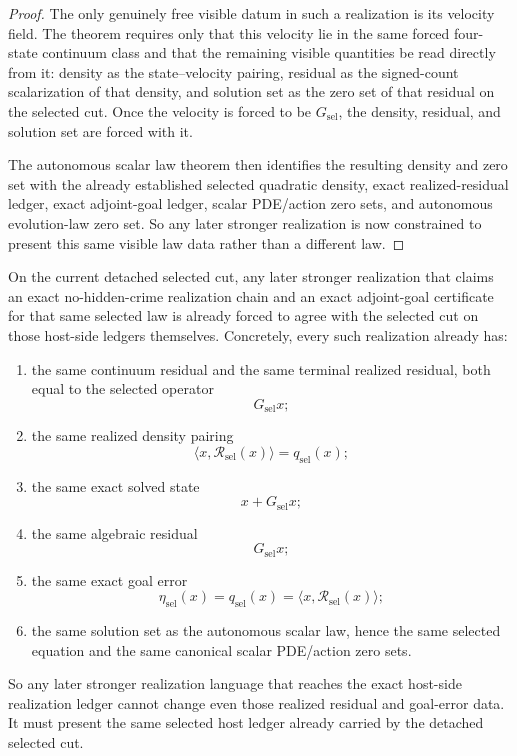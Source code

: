 \begin{proof}
The only genuinely free visible datum in such a realization is its velocity
field. The theorem requires only that this velocity lie in the same forced
four-state continuum class and that the remaining visible quantities be read
directly from it: density as the state--velocity pairing, residual as the
signed-count scalarization of that density, and solution set as the zero set
of that residual on the selected cut. Once the velocity is forced to be
\(G_{\mathrm{sel}}\), the density, residual, and solution set are forced with
it.

The autonomous scalar law theorem then identifies the resulting density and
zero set with the already established selected quadratic density, exact
realized-residual ledger, exact adjoint-goal ledger, scalar PDE/action zero
sets, and autonomous evolution-law zero set. So any later stronger
realization is now constrained to present this same visible law data rather
than a different law.
\end{proof}

\begin{theorem}
\label{thm:the-selected-cut-already-fixes-the-exact-realization-ledger-adjoint-goal-contract-for-any-later-stronger-flagship-realization}
On the current detached selected cut, any later stronger realization
that claims an exact no-hidden-crime realization chain and an exact
adjoint-goal certificate for that same selected law is already forced to agree
with the selected cut on those host-side ledgers themselves. Concretely, every
such realization already has:
\begin{enumerate}
\item the same continuum residual and the same terminal realized residual,
      both equal to the selected operator
\[
G_{\mathrm{sel}}x;
\]
\item the same realized density pairing
\[
\langle x,\mathcal R_{\mathrm{sel}}(x)\rangle=q_{\mathrm{sel}}(x);
\]
\item the same exact solved state
\[
x+G_{\mathrm{sel}}x;
\]
\item the same algebraic residual
\[
G_{\mathrm{sel}}x;
\]
\item the same exact goal error
\[
\eta_{\mathrm{sel}}(x)
 =q_{\mathrm{sel}}(x)
 =\langle x,\mathcal R_{\mathrm{sel}}(x)\rangle;
\]
\item the same solution set as the autonomous scalar law, hence the same
      selected equation and the same canonical scalar PDE/action zero sets.
\end{enumerate}
So any later stronger realization language that reaches the exact host-side
realization ledger cannot change even those realized residual and goal-error
data. It must present the same selected host ledger already carried by the
detached selected cut.
\end{theorem}

